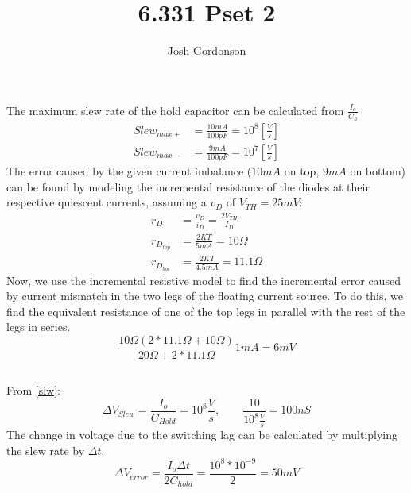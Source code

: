\documentclass{article}
\author{Josh Gordonson}
\title{6.331 Pset 2}
\begin{document}
\maketitle{}
\section{}
\subsection{}
The maximum slew rate of the hold capacitor can be calculated from $\frac{I_o}{C_h}$
\begin{align}
Slew_{max+} & = \frac{10mA}{100pF} = 10^8 [\frac{V}{s}] \label{slw}\\
Slew_{max-} & = \frac{9mA}{100pF} = 10^7 [\frac{V}{s}] 
\end{align}
The error caused by the given current imbalance ($10mA$ on top, $9mA$ on bottom) can 
be found by modeling the incremental resistance of the diodes at their respective 
quiescent currents, assuming a $v_D$ of $V_{TH} = 25mV$:
\begin{align}
r_D &= \frac{v_D}{i_D} = \frac{2V_{TH}}{I_D} \\
r_{D_{top}} &= \frac{2KT}{5mA} = 10 \Omega \label{incres}\\
r_{D_{bot}} &= \frac{2KT}{4.5mA} = 11.1 \Omega 
\end{align}
Now, we use the incremental resistive model to find the incremental error caused by 
current mismatch in the two legs of the floating current source. To do this, we find 
the equivalent resistance of one of the top legs in parallel with the rest of the legs in series.
$$
\frac{10 \Omega (2*11.1 \Omega+10 \Omega)}{20 \Omega+2*11.1 \Omega}1mA = 6mV
$$
\subsection{}
From \eqref{slw}:
$$
\Delta V_{Slew} = \frac{I_o}{C_{Hold}} = 10^8 \frac{V}{s}, \qquad \frac{10}{10^8 \frac{V}{s}}=100nS
$$
The change in voltage due to the switching lag can be calculated by multiplying the slew rate by
$\Delta t$.
$$
\Delta V_{error} = \frac{I_o \Delta t}{2C_{hold}} = \frac{10^8*10^{-9}}{2} = 50mV
$$
\end{document}
